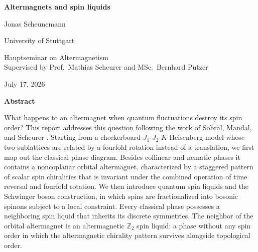 \documentclass[11pt]{article}
\newcommand{\reporttitle}{Altermagnets and spin liquids}
\newcommand{\reportauthor}{Jonas Scheunemann}
\newcommand{\reportaffiliation}{University of Stuttgart}
\newcommand{\reportseminar}{Hauptseminar on Altermagnetism}
\newcommand{\reportsupervisors}{Supervised by Prof.\ Mathias Scheurer and MSc.\ Bernhard Putzer}
\newcommand{\reportdate}{July 17, 2026}
\begin{document}

\begin{center}
    {\LARGE\bfseries \reporttitle \par}
    \vspace{1.2em}
    {\large \reportauthor \par}
    \vspace{0.8em}
    {\normalsize \reportaffiliation \par}
    \vspace{0.6em}
    {\normalsize
        \reportseminar \\
        \reportsupervisors \par
    }
    \vspace{0.8em}
    {\normalsize \reportdate \par}
\end{center}

\vspace{1.5em}

\begin{center}
    {\bfseries Abstract}
\end{center}
\noindent
What happens to an altermagnet when quantum fluctuations destroy its spin
order? This report addresses this question following the work of Sobral,
Mandal, and Scheurer \cite{Sobral2025}.
Starting from a checkerboard $J_1$-$J_2$-$K$ Heisenberg model whose two
sublattices are related by a fourfold rotation instead of a translation, we
first map out the classical phase diagram. Besides collinear and nematic phases
it contains a noncoplanar orbital altermagnet, characterized by a staggered
pattern of scalar spin chiralities that is invariant under the combined
operation of time reversal and fourfold rotation. We then introduce quantum
spin liquids and the Schwinger boson construction, in which spins are
fractionalized into bosonic spinons subject to a local constraint. Every
classical phase possesses a neighboring spin liquid that inherits its discrete
symmetries. The neighbor of the orbital altermagnet is an altermagnetic
$\mathbb{Z}_2$ spin liquid: a phase without any spin order in which the
altermagnetic chirality pattern survives alongside topological order.
\end{document}
